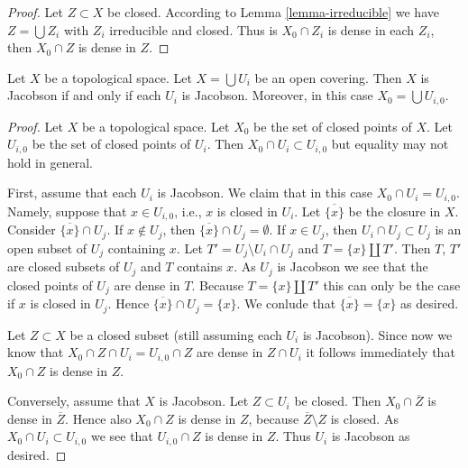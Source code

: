 \begin{proof}
Let $Z \subset X$ be closed. According to Lemma \ref{lemma-irreducible}
we have $Z = \bigcup Z_i$ with $Z_i$ irreducible and closed.
Thus is $X_0 \cap Z_i$ is dense in each $Z_i$, then $X_0 \cap Z$
is dense in $Z$.
\end{proof}

\begin{lemma}
\label{lemma-jacobson-local}
Let $X$ be a topological space.
Let $X = \bigcup U_i$ be an open covering.
Then $X$ is Jacobson if and only if each $U_i$ is Jacobson.
Moreover, in this case $X_0 = \bigcup U_{i,0}$.
\end{lemma}

\begin{proof}
Let $X$ be a topological space.
Let $X_0$ be the set of closed points of $X$.
Let $U_{i, 0}$ be the set of closed points of
$U_i$. Then $X_0 \cap U_i \subset U_{i, 0}$
but equality may not hold in general.

\medskip\noindent
First, assume that each $U_i$ is Jacobson.
We claim that in this case $X_0 \cap U_i = U_{i, 0}$.
Namely, suppose that $x \in U_{i,0}$, i.e., $x$ is closed in
$U_i$. Let $\overline{\{x\}}$ be the closure
in $X$. Consider $\overline{\{x\}} \cap U_j$.
If $x \not \in U_j$, then $\overline{\{x\}} \cap U_j = \emptyset$.
If $x \in U_j$, then $U_i \cap U_j \subset U_j$
is an open subset of $U_j$ containing $x$.
Let $T' = U_j \setminus U_i \cap U_j$ and
$T = \{x\} \coprod T'$. Then $T$, $T'$
are closed subsets of $U_j$ and $T$ contains
$x$. As $U_j$ is Jacobson we see that the closed points of 
$U_j$ are dense in $T$. Because $T = \{x\} \coprod T'$
this can only be the case if $x$ is closed in $U_j$.
Hence $\overline{\{x\}} \cap U_j = \{x\}$. We conlude
that $\overline{\{x\}} = \{ x \}$ as desired.

\medskip\noindent
Let $Z \subset X$ be a closed subset (still
assuming each $U_i$ is Jacobson).
Since now we know that $X_0 \cap Z  \cap U_i
= U_{i, 0} \cap Z$ are dense in $Z \cap U_i$
it follows immediately that $X_0 \cap Z$ is
dense in $Z$.

\medskip\noindent
Conversely, assume that $X$ is Jacobson.
Let $Z \subset U_i$ be closed. Then
$X_0 \cap \overline{Z}$ is dense in $\overline{Z}$.
Hence also $X_0 \cap Z$ is dense in $Z$, because
$\overline{Z} \setminus Z$ is closed. As $X_0 \cap U_i
\subset U_{i,0}$ we see that
$U_{i,0} \cap Z$ is dense in $Z$.
Thus $U_i$ is Jacobson as desired.
\end{proof}

